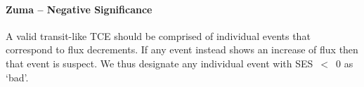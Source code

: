 

\paragraph{Zuma -- Negative Significance}

A valid transit-like TCE should be comprised of individual events that correspond to flux decrements. If any event instead shows an increase of flux then that event is suspect. We thus designate any individual event with SES~$<$~0 as `bad'.


